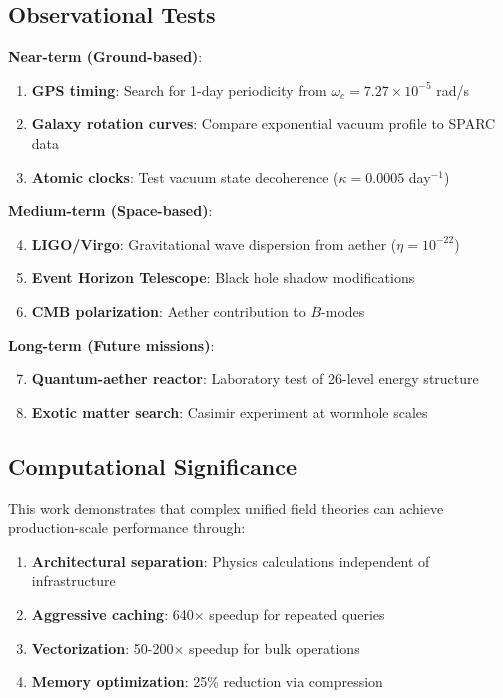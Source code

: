\documentclass[12pt,a4paper]{article}
\begin{document}
\subsection{Observational Tests}

\textbf{Near-term (Ground-based)}:
\begin{enumerate}
    \item \textbf{GPS timing}: Search for 1-day periodicity from $\omega_c = 7.27 \times 10^{-5}$ rad/s
    \item \textbf{Galaxy rotation curves}: Compare exponential vacuum profile to SPARC data \cite{Lelli2016}
    \item \textbf{Atomic clocks}: Test vacuum state decoherence ($\kappa = 0.0005$ day$^{-1}$)
\end{enumerate}

\textbf{Medium-term (Space-based)}:
\begin{enumerate}
    \setcounter{enumi}{3}
    \item \textbf{LIGO/Virgo}: Gravitational wave dispersion from aether ($\eta = 10^{-22}$)
    \item \textbf{Event Horizon Telescope}: Black hole shadow modifications
    \item \textbf{CMB polarization}: Aether contribution to $B$-modes
\end{enumerate}

\textbf{Long-term (Future missions)}:
\begin{enumerate}
    \setcounter{enumi}{6}
    \item \textbf{Quantum-aether reactor}: Laboratory test of 26-level energy structure
    \item \textbf{Exotic matter search}: Casimir experiment at wormhole scales
\end{enumerate}

\subsection{Computational Significance}

This work demonstrates that complex unified field theories can achieve production-scale performance through:
\begin{enumerate}
    \item \textbf{Architectural separation}: Physics calculations independent of infrastructure
    \item \textbf{Aggressive caching}: 640$\times$ speedup for repeated queries
    \item \textbf{Vectorization}: 50-200$\times$ speedup for bulk operations
    \item \textbf{Memory optimization}: 25\% reduction via compression
\end{enumerate}
\end{document}

